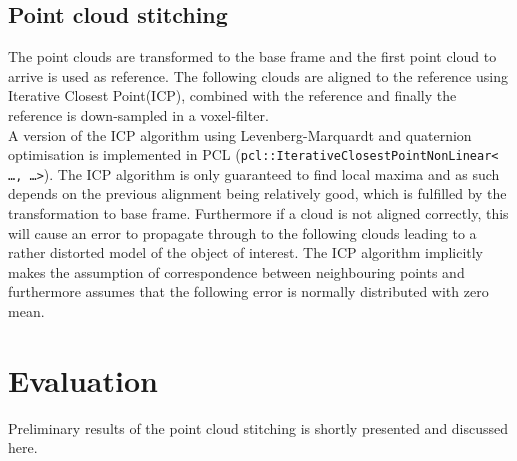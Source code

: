 \subsection{Point cloud stitching}

The point clouds are transformed to the base frame and the first point cloud to arrive is used as reference. The following clouds are aligned to the reference using Iterative Closest Point(ICP), combined with the reference and finally the reference is down-sampled in a voxel-filter.\\ 

A version of the ICP algorithm using Levenberg-Marquardt and quaternion optimisation\cite{Rusinkiewicz} is implemented in PCL (\texttt{pcl::IterativeClosestPointNonLinear< \ldots , \ldots >}). The ICP algorithm is only guaranteed to find local maxima and as such depends on the previous alignment being relatively good, which is fulfilled by the transformation to base frame. Furthermore if a cloud is not aligned correctly, this will cause an error to propagate through to the following clouds leading to a rather distorted model of the object of interest\cite{choe2007registration}. The ICP algorithm implicitly makes the assumption of correspondence between neighbouring points and furthermore assumes that the following error is normally distributed with zero mean.

\section{Evaluation}
Preliminary results of the point cloud stitching is shortly presented and discussed here. 

